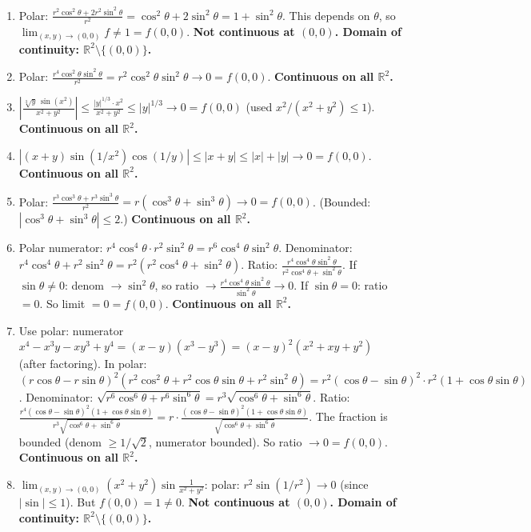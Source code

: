 \documentclass[12pt,a4paper]{article}
\begin{document}
\begin{enumerate}[leftmargin=*, label=(\alph*)]

\item Polar: $\frac{r^2\cos^2\theta+2r^2\sin^2\theta}{r^2}=\cos^2\theta+2\sin^2\theta=1+\sin^2\theta$.
This depends on $\theta$, so $\lim_{(x,y)\to(0,0)}f\ne 1=f(0,0)$. \textbf{Not continuous at $(0,0)$. Domain of continuity: $\mathbb{R}^2\setminus\{(0,0)\}$.}

\item Polar: $\frac{r^4\cos^2\theta\sin^2\theta}{r^2}=r^2\cos^2\theta\sin^2\theta\to 0=f(0,0)$. \textbf{Continuous on all $\mathbb{R}^2$.}

\item $\left|\frac{\sqrt[3]{y}\,\sin(x^2)}{x^2+y^2}\right|\le\frac{|y|^{1/3}\cdot x^2}{x^2+y^2}\le|y|^{1/3}\to 0=f(0,0)$
(used $x^2/(x^2+y^2)\le 1$). \textbf{Continuous on all $\mathbb{R}^2$.}

\item $|(x+y)\sin(1/x^2)\cos(1/y)|\le|x+y|\le|x|+|y|\to 0=f(0,0)$. \textbf{Continuous on all $\mathbb{R}^2$.}

\item Polar: $\frac{r^3\cos^3\theta+r^3\sin^3\theta}{r^2}=r(\cos^3\theta+\sin^3\theta)\to 0=f(0,0)$.
(Bounded: $|\cos^3\theta+\sin^3\theta|\le 2$.) \textbf{Continuous on all $\mathbb{R}^2$.}

\item Polar numerator: $r^4\cos^4\theta\cdot r^2\sin^2\theta=r^6\cos^4\theta\sin^2\theta$.
Denominator: $r^4\cos^4\theta+r^2\sin^2\theta=r^2(r^2\cos^4\theta+\sin^2\theta)$.
Ratio: $\frac{r^4\cos^4\theta\sin^2\theta}{r^2\cos^4\theta+\sin^2\theta}$.
If $\sin\theta\ne 0$: denom $\to\sin^2\theta$, so ratio $\to\frac{r^4\cos^4\theta\sin^2\theta}{\sin^2\theta}\to 0$.
If $\sin\theta=0$: ratio $=0$.
So limit $=0=f(0,0)$. \textbf{Continuous on all $\mathbb{R}^2$.}

\item Use polar: numerator $x^4-x^3y-xy^3+y^4=(x-y)(x^3-y^3)=(x-y)^2(x^2+xy+y^2)$ (after factoring).
In polar: $(r\cos\theta-r\sin\theta)^2(r^2\cos^2\theta+r^2\cos\theta\sin\theta+r^2\sin^2\theta)=r^2(\cos\theta-\sin\theta)^2\cdot r^2(1+\cos\theta\sin\theta)$.
Denominator: $\sqrt{r^6\cos^6\theta+r^6\sin^6\theta}=r^3\sqrt{\cos^6\theta+\sin^6\theta}$.
Ratio: $\frac{r^4(\cos\theta-\sin\theta)^2(1+\cos\theta\sin\theta)}{r^3\sqrt{\cos^6\theta+\sin^6\theta}}=r\cdot\frac{(\cos\theta-\sin\theta)^2(1+\cos\theta\sin\theta)}{\sqrt{\cos^6\theta+\sin^6\theta}}$.
The fraction is bounded (denom $\ge 1/\sqrt{2}$, numerator bounded). So ratio $\to 0=f(0,0)$.
\textbf{Continuous on all $\mathbb{R}^2$.}

\item $\lim_{(x,y)\to(0,0)}(x^2+y^2)\sin\!\frac{1}{x^2+y^2}$: polar: $r^2\sin(1/r^2)\to 0$ (since $|\sin|\le 1$).
But $f(0,0)=1\ne 0$. \textbf{Not continuous at $(0,0)$. Domain of continuity: $\mathbb{R}^2\setminus\{(0,0)\}$.}

\end{enumerate}
\end{document}
